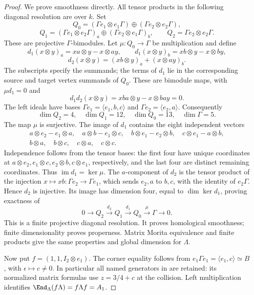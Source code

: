 \begin{proof}
We prove smoothness directly. All tensor products in the following
diagonal resolution are over $k$. Set
\[
 Q_0=(\Gamma e_1\otimes e_1\Gamma)
          \oplus(\Gamma e_2\otimes e_2\Gamma),
\]
\[
 Q_1=(\Gamma e_1\otimes e_2\Gamma)_a
          \oplus(\Gamma e_2\otimes e_1\Gamma)_b,\qquad
 Q_2=\Gamma e_2\otimes e_2\Gamma.
\]
These are projective $\Gamma$-bimodules. Let $\mu:Q_0\to\Gamma$
be multiplication and define
\[
 d_1(x\otimes y)_a=xa\otimes y-x\otimes ay,\qquad
 d_1(x\otimes y)_b=xb\otimes y-x\otimes by,
\]
\[
 d_2(x\otimes y)=(xb\otimes y)_a+(x\otimes ay)_b.
\]
The subscripts specify the summands; the terms of $d_1$ lie in
the corresponding source and target vertex summands of $Q_0$.
These are bimodule maps, with $\mu d_1=0$ and
\[
 d_1d_2(x\otimes y)=xba\otimes y-x\otimes bay=0.
\]
The left ideals have bases
$\Gamma e_1=\langle e_1,b,c\rangle$ and
$\Gamma e_2=\langle e_2,a\rangle$. Consequently
\[
 \dim Q_2=4,\quad\dim Q_1=12,\quad\dim Q_0=13,\quad
 \dim\Gamma=5.
\]
The map $\mu$ is surjective. The image of $d_1$ contains the
eight independent vectors
\[
 \begin{gathered}
 a\otimes e_2-e_1\otimes a,\quad
 a\otimes b-e_1\otimes c,\quad
 b\otimes e_1-e_2\otimes b,\quad
 c\otimes e_1-a\otimes b,\\
 b\otimes a,\quad b\otimes c,\quad
 c\otimes a,\quad c\otimes c.
 \end{gathered}
\]
Independence follows from the tensor bases: the first four have
unique coordinates at $a\otimes e_2,e_1\otimes c,e_2\otimes b,
c\otimes e_1$, respectively, and the last four are distinct
remaining coordinates. Thus $\operatorname{im}d_1=\ker\mu$.
The $a$-component of $d_2$ is the tensor product of the injection
$x\mapsto xb:\Gamma e_2\to\Gamma e_1$, which sends $e_2,a$
to $b,c$, with the identity of $e_2\Gamma$. Hence $d_2$ is
injective. Its image has dimension four, equal to
$\dim\ker d_1$, proving exactness of
\begin{equation}\label{eq:auslanderdiagonal}
 0\longrightarrow Q_2\xrightarrow{d_2}Q_1
   \xrightarrow{d_1}Q_0\xrightarrow{\mu}\Gamma
   \longrightarrow0.
\end{equation}
This is a finite projective diagonal resolution. It proves
homological smoothness; finite dimensionality proves properness.
Matrix Morita equivalence and finite products give the same
properties and global dimension for $\Lambda$.

Now put $f=(1,1,I_2\otimes e_1)$. The corner equality follows
from $e_1\Gamma e_1=\langle e_1,c\rangle\simeq B$, with
$\epsilon\mapsto c\ne0$. In particular all named generators in
 are retained: its normalized matrix formulas use
$z=3/4+c$ at the collision. Left multiplication identifies
$\End_\Lambda(f\Lambda)=f\Lambda f=A_1$.


\end{proof}
